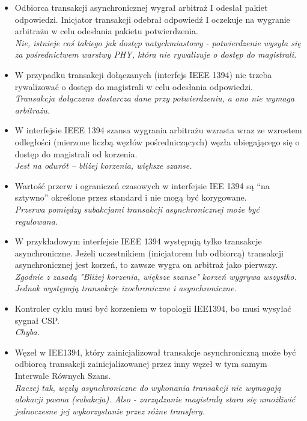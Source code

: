 \documentclass[a4paper,twoside]{article}
\begin{document}
\begin{itemize}
	\item \textcolor{nie}{Odbiorca transakcji asynchronicznej wygrał arbitraż I odesłał pakiet odpowiedzi. Inicjator transakcji odebrał odpowiedź I oczekuje na wygranie arbitrażu w celu odesłania pakietu potwierdzenia.} \\
	{\small \emph{Nie, istnieje coś takiego jak dostęp natychmiastowy - potwierdzenie wysyła się za pośrednictwem warstwy PHY, która nie rywalizuje o dostęp do magistrali.}}
	
	\item \textcolor{tak}{W przypadku transakcji dołączanych (interfejs IEEE 1394) nie trzeba rywalizować o dostęp do magistrali w celu odesłania odpowiedzi.} \\
	{\small \emph{Transakcja dołączana dostarcza dane przy potwierdzeniu, a ono nie wymaga arbitrażu.}}
	
	\item \textcolor{nie}{W interfejsie IEEE 1394 szansa wygrania arbitrażu wzrasta wraz ze wzrostem odległości (mierzone liczbą węzłów pośredniczących) węzła ubiegającego się o dostęp do magistrali od korzenia.} \\
	{\small \emph{Jest na odwrót – bliżej korzenia, większe szanse.}}
	
	\item \textcolor{nie}{Wartość przerw i ograniczeń czasowych w interfejsie IEE 1394 są “na sztywno” określone przez standard i nie mogą być korygowane.} \\
	{\small \emph{Przerwa pomiędzy subakcjami transakcji asynchronicznej może być regulowana.}}
	
	\item \textcolor{nie}{W przykładowym interfejsie IEEE 1394 występują tylko transakcje asynchroniczne. Jeżeli uczestnikiem (inicjatorem lub odbiorcą) transakcji asynchronicznej jest korzeń, to zawsze wygra on arbitraż jako pierwszy.} \\
	{\small \emph{Zgodnie z zasadą "Bliżej korzenia, większe szanse" korzeń wygrywa wszystko. Jednak występują transakcje izochroniczne i asynchroniczne.}}
	
	\item \textcolor{tak}{Kontroler cyklu musi być korzeniem w topologii IEE1394, bo musi wysyłać sygnał CSP.} \\
	{\small \emph{Chyba.}}
	
	\item \textcolor{tak}{Węzeł w IEE1394, który zainicjalizował transakcje asynchroniczną może być odbiorcą transakcji zainicjalizowanej przez inny węzeł w tym samym Interwale Równych Szans.} \\
	{\small \emph{Raczej tak, węzły asynchroniczne do wykonania transakcji nie wymagają alokacji pasma (subakcja). Also - zarządzanie magistralą stara się umożliwić jednoczesne jej wykorzystanie przez różne transfery.}}
	
\end{itemize}
\end{document}
